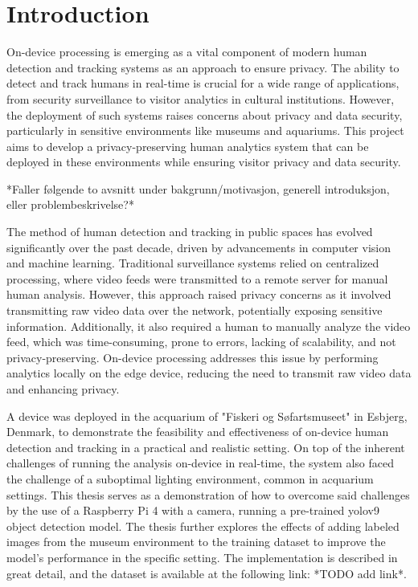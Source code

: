 \section{Introduction} 
On-device processing is emerging as a vital component of modern human detection and tracking systems as an approach to ensure privacy. The ability to detect and track humans in real-time is crucial for a wide range of applications, from security surveillance to visitor analytics in cultural institutions. However, the deployment of such systems raises concerns about privacy and data security, particularly in sensitive environments like museums and aquariums. This project aims to develop a privacy-preserving human analytics system that can be deployed in these environments while ensuring visitor privacy and data security.

*Faller følgende to avsnitt under bakgrunn/motivasjon, generell introduksjon, eller problembeskrivelse?*

The method of human detection and tracking in public spaces has evolved significantly over the past decade, driven by advancements in computer vision and machine learning. Traditional surveillance systems relied on centralized processing, where video feeds were transmitted to a remote server for manual human analysis. However, this approach raised privacy concerns as it involved transmitting raw video data over the network, potentially exposing sensitive information. Additionally, it also required a human to manually analyze the video feed, which was time-consuming, prone to errors, lacking of scalability, and not privacy-preserving. On-device processing addresses this issue by performing analytics locally on the edge device, reducing the need to transmit raw video data and enhancing privacy.  

A device was deployed in the acquarium of "Fiskeri og Søfartsmuseet" in Esbjerg, Denmark, to demonstrate the feasibility and effectiveness of on-device human detection and tracking in a practical and realistic setting. On top of the inherent challenges of running the analysis on-device in real-time, the system also faced the challenge of a suboptimal lighting environment, common in acquarium settings. This thesis serves as a demonstration of how to overcome said challenges by the use of a Raspberry Pi 4 with a camera, running a pre-trained yolov9 object detection model. The thesis further explores the effects of adding labeled images from the museum environment to the training dataset to improve the model's performance in the specific setting. The implementation is described in great detail, and the dataset is available at the following link: *TODO add link*. 

